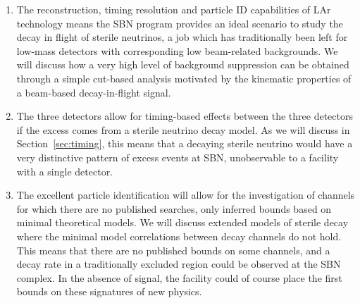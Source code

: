 \documentclass[11pt, a4paper]{article}
\newcommand{\refsec}[1]{Section~\ref{#1}}
\begin{document}
\begin{enumerate}

\item The reconstruction, timing resolution and particle ID capabilities of LAr
technology means the SBN program provides an ideal scenario to study the decay
in flight of sterile neutrinos, a job which has traditionally been left for
low-mass detectors with corresponding low beam-related backgrounds. 
%
We will discuss how a very high level of background suppression can be obtained
through a simple cut-based analysis motivated by the kinematic properties of a
beam-based decay-in-flight signal. 

\item The three detectors allow for timing-based effects between 
the three detectors if the excess comes from a sterile neutrino decay 
model. As we will discuss in \refsec{sec:timing}, this means that a decaying 
sterile neutrino would have a very distinctive pattern of excess events at
SBN, unobservable to a facility with a single detector.

\item The excellent particle identification will allow for the investigation of
channels for which there are no published searches, only inferred bounds based
on minimal theoretical models. We will discuss extended models of sterile decay
where the minimal model correlations between decay channels do not hold. This
means that there are no published bounds on some channels, and a decay rate in
a traditionally excluded region could be observed at the SBN complex. In the
absence of signal, the facility could of course place the first bounds on these
signatures of new physics.

\end{enumerate} 
\end{document}
